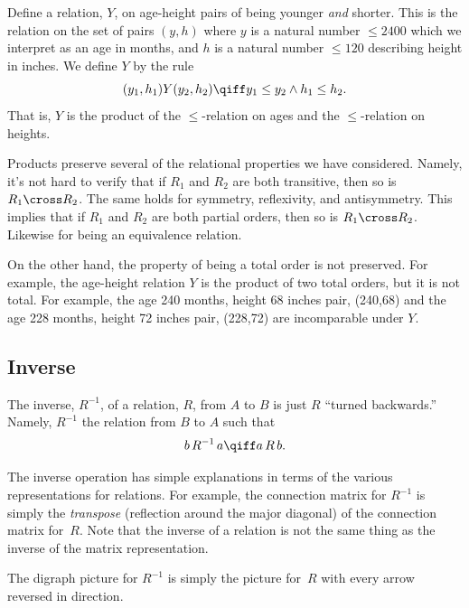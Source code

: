 \begin{example}
Define a relation, $Y$, on age-height pairs of being younger \emph{and}
shorter.  This is the relation on the set of pairs $(y,h)$ where $y$ is a
natural number $\le 2400$ which we interpret as an age in months, and $h$
is a natural number $\le 120$ describing height in inches.  We define $Y$
by the rule
\[
(y_1,h_1) Y (y_2,h_2) \qiff y_1 \le y_2 \land h_1 \le h_2.
\]
That is, $Y$ is the product of the $\le$-relation on ages and the
$\le$-relation on heights.
\end{example}

Products preserve several of the relational properties we have considered.
Namely, it's not hard to verify that if $R_1$ and $R_2$ are both
transitive, then so is $R_1 \cross R_2$.  The same holds for symmetry,
reflexivity, and antisymmetry.  This implies that if $R_1$ and $R_2$ are
both partial orders, then so is $R_1 \cross R_2$.  Likewise for being an
equivalence relation.

On the other hand, the property of being a total order is not preserved.
For example, the age-height relation $Y$ is the product of two total
orders, but it is not total.  For example, the age 240 months, height 68
inches pair, (240,68) and the age 228 months, height 72 inches pair,
(228,72) are incomparable under $Y$.

\subsection{Inverse}

The inverse, $R^{-1}$, of a relation, $R$, from $A$ to $B$ is just $R$
``turned backwards.''  Namely, $R^{-1}$ the relation from $B$ to $A$ such that
\[
b\, R^{-1}\, a \qiff a\, R\, b.
\]

The inverse operation has simple explanations in terms of the various
representations for relations.  For example, the connection matrix for
$R^{-1}$ is simply the \emph{transpose} (reflection around the major
diagonal) of the connection matrix for~$R$.  Note that the inverse of a
relation is not the same thing as the inverse of the matrix
representation.

The digraph picture for $R^{-1}$ is simply the picture for~$R$ with every
arrow reversed in direction.

